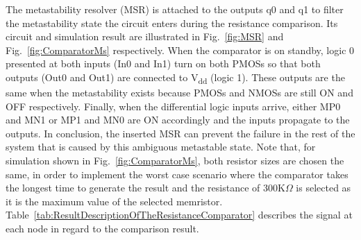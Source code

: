 \documentclass[twocolumn,conference]{IEEEtran}
\begin{document}
The metastability resolver (MSR) is attached to the outputs q0 and q1 to filter the metastability state the circuit enters during the resistance comparison. Its circuit and simulation result are illustrated in Fig.~\ref{fig:MSR} and Fig.~\ref{fig:ComparatorMs} respectively. When the comparator is on standby, logic 0 presented at both inputs (In0 and In1) turn on both PMOSs so that both outputs (Out0 and Out1) are connected to V\textsubscript{dd} (logic 1). These outputs are the same when the metastability exists because PMOSs and NMOSs are still ON and OFF respectively. Finally, when the differential logic inputs arrive, either MP0 and MN1 or MP1 and MN0 are ON accordingly and the inputs propagate to the outputs. In conclusion, the inserted MSR can prevent the failure in the rest of the system that is caused by this ambiguous metastable state. Note that, for simulation shown in Fig.~\ref{fig:ComparatorMs}, both resistor sizes are chosen the same, in order to implement the worst case scenario where the comparator takes the longest time to generate the result and the resistance of 300K$\Omega$ is selected as it is the maximum value of the selected memristor. Table~\ref{tab:ResultDescriptionOfTheResistanceComparator} describes the signal at each node in regard to the comparison result.
\end{document}
